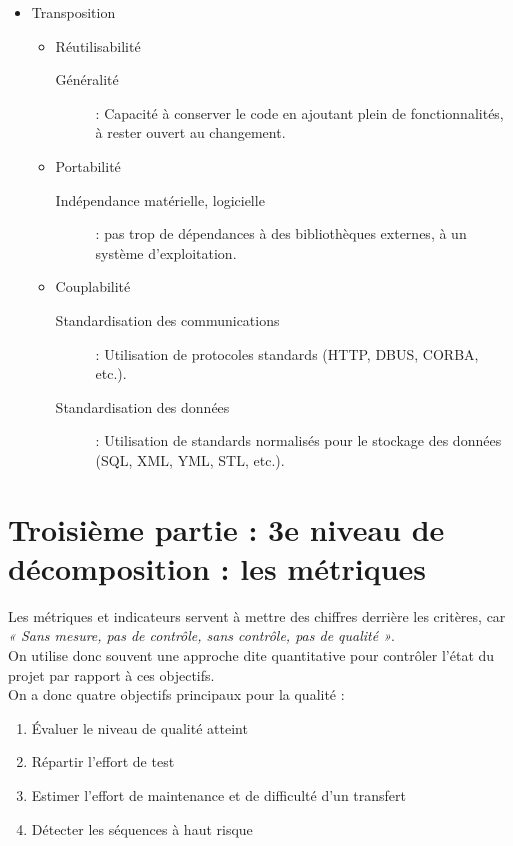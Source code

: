 \begin{itemize}
\item Transposition
	\begin{itemize}

	\item Réutilisabilité
		\begin{description}	
		\item[Généralité] : Capacité à conserver le code en ajoutant plein de fonctionnalités, à rester ouvert au changement.
		\end{description}

	\item Portabilité	
		\begin{description}	
		\item[Indépendance matérielle, logicielle] : pas trop de dépendances à des bibliothèques externes, à un système d'exploitation.
		\end{description}

	\item Couplabilité
		\begin{description}	
		\item[Standardisation des communications] : Utilisation de protocoles standards (HTTP, DBUS, CORBA, etc.).
		\item[Standardisation des données] : Utilisation de standards normalisés pour le stockage des données (SQL, XML, YML, STL, etc.).
		\end{description}

	\end{itemize}

\end{itemize}


\section{Troisième partie : 3e niveau de décomposition : les métriques}

Les métriques et indicateurs servent à mettre des chiffres derrière les critères, car \textit{« Sans mesure, pas de contrôle, sans contrôle, pas de qualité »}.\\
On utilise donc souvent une approche dite quantitative pour contrôler l’état du projet par rapport à ces objectifs.\\ 
On a donc quatre objectifs principaux pour la qualité :
\begin{enumerate}
\item Évaluer le niveau de qualité atteint
\item Répartir l’effort de test
\item Estimer l’effort de maintenance et de difficulté d’un transfert
\item Détecter les séquences à haut risque
\end{enumerate}

